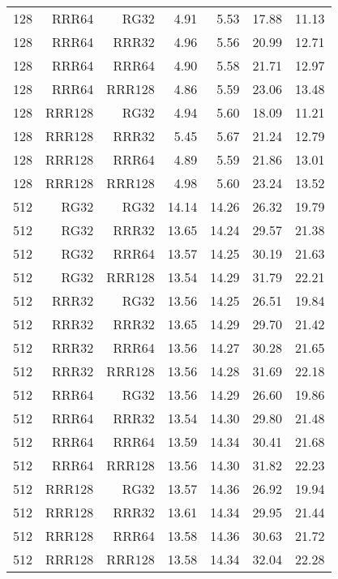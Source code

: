 \begin{table}
\begin{tabular}{|r|r|r|r|r|r|r|}
128 & RRR64 & RG32 & 4.91 & 5.53 & 17.88 & 11.13 \\
128 & RRR64 & RRR32 & 4.96 & 5.56 & 20.99 & 12.71 \\
128 & RRR64 & RRR64 & 4.90 & 5.58 & 21.71 & 12.97 \\
128 & RRR64 & RRR128 & 4.86 & 5.59 & 23.06 & 13.48 \\
128 & RRR128 & RG32 & 4.94 & 5.60 & 18.09 & 11.21 \\
128 & RRR128 & RRR32 & 5.45 & 5.67 & 21.24 & 12.79 \\
128 & RRR128 & RRR64 & 4.89 & 5.59 & 21.86 & 13.01 \\
128 & RRR128 & RRR128 & 4.98 & 5.60 & 23.24 & 13.52 \\
512 & RG32 & RG32 & 14.14 & 14.26 & 26.32 & 19.79 \\
512 & RG32 & RRR32 & 13.65 & 14.24 & 29.57 & 21.38 \\
512 & RG32 & RRR64 & 13.57 & 14.25 & 30.19 & 21.63 \\
512 & RG32 & RRR128 & 13.54 & 14.29 & 31.79 & 22.21 \\
512 & RRR32 & RG32 & 13.56 & 14.25 & 26.51 & 19.84 \\
512 & RRR32 & RRR32 & 13.65 & 14.29 & 29.70 & 21.42 \\
512 & RRR32 & RRR64 & 13.56 & 14.27 & 30.28 & 21.65 \\
512 & RRR32 & RRR128 & 13.56 & 14.28 & 31.69 & 22.18 \\
512 & RRR64 & RG32 & 13.56 & 14.29 & 26.60 & 19.86 \\
512 & RRR64 & RRR32 & 13.54 & 14.30 & 29.80 & 21.48 \\
512 & RRR64 & RRR64 & 13.59 & 14.34 & 30.41 & 21.68 \\
512 & RRR64 & RRR128 & 13.56 & 14.30 & 31.82 & 22.23 \\
512 & RRR128 & RG32 & 13.57 & 14.36 & 26.92 & 19.94 \\
512 & RRR128 & RRR32 & 13.61 & 14.34 & 29.95 & 21.44 \\
512 & RRR128 & RRR64 & 13.58 & 14.36 & 30.63 & 21.72 \\
512 & RRR128 & RRR128 & 13.58 & 14.34 & 32.04 & 22.28 \\
\hline
\end{tabular}
\end{table}

